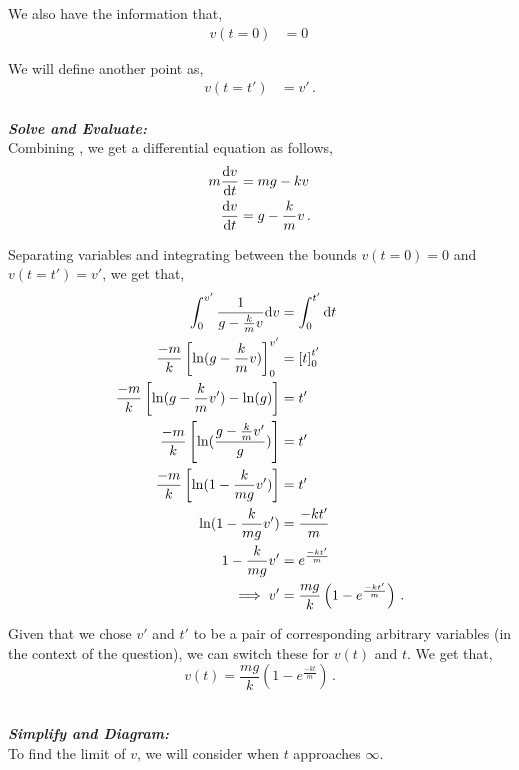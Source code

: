 \begin{subquestions}
\begin{subsubquestions}
We also have the information that,
\begin{align}
	v(t=0) & = 0 \,
\end{align}

We will define another point as,
\begin{align}
	v(t=t') & = v' \,.
\end{align}\\



\textbf{\textit{Solve and Evaluate:}} \\ 
Combining , we get a differential equation as follows,
\begin{align}
	m\frac{\mathrm{d}v}{\mathrm{d}t} & = mg - kv \nonumber \\
	\frac{\mathrm{d}v}{\mathrm{d}t} & = g -\frac{k}{m}v \,.
\end{align}

Separating variables and integrating between the bounds $v(t=0)=0$ and $v(t=t')=v'$, we get that,
\begin{align}
	\int_{0}^{v'}\frac{1}{g-\frac{k}{m}v} \mathrm{d} v & = \int_{0}^{t'} \mathrm{d} t \nonumber \\
	\frac{-m}{k}\left[\ln(g-\frac{k}{m}v)\right]_{0}^{v'} & = \left[t\right]_0^{t'} \nonumber \\
	\frac{-m}{k}\left[\ln(g-\frac{k}{m}v')-\ln(g)\right] & = t' \nonumber \\
	\frac{-m}{k}\left[\ln(\frac{g-\frac{k}{m}v'}{g})\right] & = t' \nonumber \\
	\frac{-m}{k}\left[\ln(1-\frac{k}{mg}v')\right] & = t' \nonumber \\
	\ln(1-\frac{k}{mg}v') & = \frac{-kt'}{m} \nonumber \\
	1-\frac{k}{mg}v' & = e^{\frac{-kt'}{m}} \nonumber \\
	\implies v' & = \frac{mg}{k}\left(1-e^{\frac{-kt'}{m}}\right) \,.
\end{align}

Given that we chose $v'$ and $t'$ to be a pair of corresponding arbitrary variables (in the context of the question), we can switch these for $v(t)$ and $t$. We get that,
\begin{equation}
	v(t) = \frac{mg}{k}\left(1-e^{\frac{-kt}{m}}\right) \,.
\end{equation}\\


\subsubquestion

\textbf{\textit{Simplify and Diagram:}} \\ 
To find the limit of $v$, we will consider when $t$ approaches $\infty$.\\





\end{subsubquestions}
\end{subquestions}
